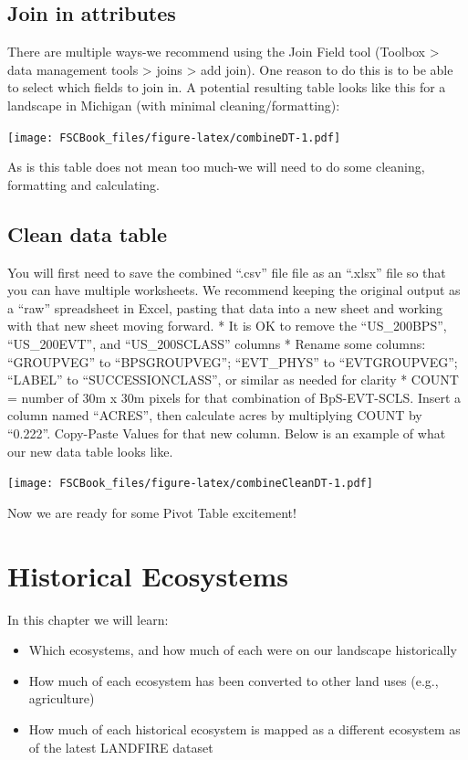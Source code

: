 \documentclass[
]{book}
\providecommand{\tightlist}{%
  \setlength{\itemsep}{0pt}\setlength{\parskip}{0pt}}
\begin{document}
\hypertarget{join-in-attributes}{%
\section{Join in attributes}\label{join-in-attributes}}

There are multiple ways-we recommend using the Join Field tool (Toolbox \textgreater{} data management tools \textgreater{} joins \textgreater{} add join). One reason to do this is to be able to select which fields to join in. A potential resulting table looks like this for a landscape in Michigan (with minimal cleaning/formatting):

\texttt{[image: FSCBook\_files/figure-latex/combineDT-1.pdf]}

As is this table does not mean too much-we will need to do some cleaning, formatting and calculating.

\hypertarget{clean-data-table}{%
\section{Clean data table}\label{clean-data-table}}

You will first need to save the combined ``.csv'' file file as an ``.xlsx'' file so that you can have multiple worksheets. We recommend keeping the original output as a ``raw'' spreadsheet in Excel, pasting that data into a new sheet and working with that new sheet moving forward.
* It is OK to remove the ``US\_200BPS'', ``US\_200EVT'', and ``US\_200SCLASS'' columns
* Rename some columns: ``GROUPVEG'' to ``BPSGROUPVEG''; ``EVT\_PHYS'' to ``EVTGROUPVEG''; ``LABEL'' to ``SUCCESSIONCLASS'', or similar as needed for clarity
* COUNT = number of 30m x 30m pixels for that combination of BpS-EVT-SCLS. Insert a column named ``ACRES'', then calculate acres by multiplying COUNT by ``0.222''. Copy-Paste Values for that new column. Below is an example of what our new data table looks like.

\texttt{[image: FSCBook\_files/figure-latex/combineCleanDT-1.pdf]}

Now we are ready for some Pivot Table excitement!

\hypertarget{historicalEcosystems}{%
\chapter{Historical Ecosystems}\label{historicalEcosystems}}

In this chapter we will learn:

\begin{itemize}
\tightlist
\item
  Which ecosystems, and how much of each were on our landscape historically
\item
  How much of each ecosystem has been converted to other land uses (e.g., agriculture)
\item
  How much of each historical ecosystem is mapped as a different ecosystem as of the latest LANDFIRE dataset
\end{itemize}
\end{document}
